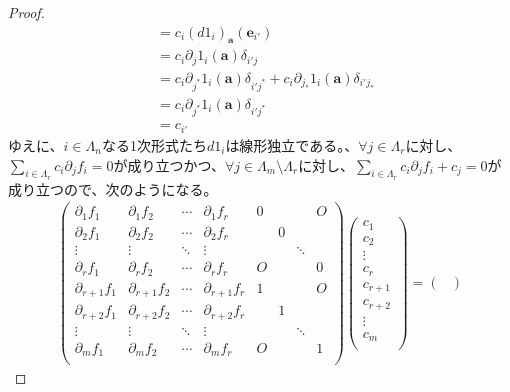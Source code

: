 \documentclass[dvipdfmx]{jsarticle}
\begin{document}
\begin{proof}
{\begin{align*}
&= c_i \left(d1_i \right)_{\mathbf{a} } \left( \mathbf{e}_{i'} \right) \\
&= c_i \partial_j 1_i \left( \mathbf{a} \right) \delta_{i'j} \\
&= c_i \partial_{j^*} 1_i \left( \mathbf{a} \right) \delta_{i'j^*} + c_i \partial_{j_*} 1_i \left( \mathbf{a} \right) \delta_{i'j_*} \\
&= c_i \partial_{j^*} 1_i \left( \mathbf{a} \right) \delta_{i'j^*} \\
&= c_{i'} 
\end{align*}
ゆえに、$i \in \varLambda_{n}$なる1次形式たち$d1_{i}$は線形独立である。}、$\forall j \in \varLambda_{r}$に対し、$\sum_{i \in \varLambda_{r}} {c_{i}\partial_{j}f_{i}} = 0$が成り立つかつ、$\forall j \in \varLambda_{m} \setminus \varLambda_{r}$に対し、$\sum_{i \in \varLambda_{r}} {c_{i}\partial_{j}f_{i}} + c_{j} = 0$が成り立つので、次のようになる。
\begin{align*}
\begin{pmatrix}
\partial_{1}f_{1} & \partial_{1}f_{2} & \cdots & \partial_{1}f_{r} & 0 & \  & \  & O \\
\partial_{2}f_{1} & \partial_{2}f_{2} & \cdots & \partial_{2}f_{r} & \  & 0 & \  & \  \\
 \vdots & \vdots & \ddots & \vdots & \  & \  & \ddots & \  \\
\partial_{r}f_{1} & \partial_{r}f_{2} & \cdots & \partial_{r}f_{r} & O & \  & \  & 0 \\
\partial_{r + 1}f_{1} & \partial_{r + 1}f_{2} & \cdots & \partial_{r + 1}f_{r} & 1 & \  & \  & O \\
\partial_{r + 2}f_{1} & \partial_{r + 2}f_{2} & \cdots & \partial_{r + 2}f_{r} & \  & 1 & \  & \  \\
 \vdots & \vdots & \ddots & \vdots & \  & \  & \ddots & \  \\
\partial_{m}f_{1} & \partial_{m}f_{2} & \cdots & \partial_{m}f_{r} & O & \  & \  & 1 \\
\end{pmatrix}\begin{pmatrix}
c_{1} \\
c_{2} \\
 \vdots \\
c_{r} \\
c_{r + 1} \\
c_{r + 2} \\
 \vdots \\
c_{m} \\
\end{pmatrix} = \begin{pmatrix}

\end{pmatrix}
\end{align*}
\end{proof}
\end{document}
